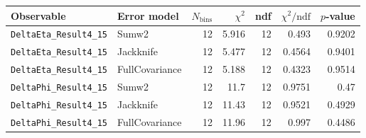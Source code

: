 \begin{tabular}{|l|l|r|r|r|r|r|}
\hline
Observable & Error model & $N_{\mathrm{bins}}$ & $\chi^2$ & ndf & $\chi^2/\mathrm{ndf}$ & $p$-value \\
\hline
\texttt{DeltaEta\_Result4\_15} & Sumw2 & 12 & 5.916 & 12 & 0.493 & 0.9202 \\
\texttt{DeltaEta\_Result4\_15} & Jackknife & 12 & 5.477 & 12 & 0.4564 & 0.9401 \\
\texttt{DeltaEta\_Result4\_15} & FullCovariance & 12 & 5.188 & 12 & 0.4323 & 0.9514 \\
\texttt{DeltaPhi\_Result4\_15} & Sumw2 & 12 & 11.7 & 12 & 0.9751 & 0.47 \\
\texttt{DeltaPhi\_Result4\_15} & Jackknife & 12 & 11.43 & 12 & 0.9521 & 0.4929 \\
\texttt{DeltaPhi\_Result4\_15} & FullCovariance & 12 & 11.96 & 12 & 0.997 & 0.4486 \\
\hline
\end{tabular}
